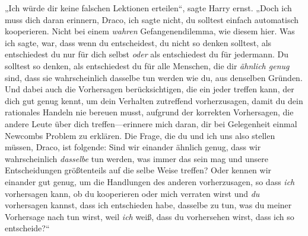 „Ich würde dir keine falschen Lektionen erteilen“, sagte Harry ernst. „Doch ich muss dich daran erinnern, Draco, ich sagte nicht, du solltest einfach automatisch kooperieren. Nicht bei einem \emph{wahren} Gefangenendilemma, wie diesem hier. Was ich sagte, war, dass wenn du entscheidest, du nicht so denken solltest, als entschiedest du nur für dich selbst \emph{oder} als entschiedest du für jedermann. Du solltest so denken, als entschiedest du für alle Menschen, die dir \emph{ähnlich genug} sind, dass sie wahrscheinlich dasselbe tun werden wie du, aus denselben Gründen. Und dabei auch die Vorhersagen berücksichtigen, die ein jeder treffen kann, der dich gut genug kennt, um dein Verhalten zutreffend vorherzusagen, damit du dein rationales Handeln nie bereuen musst, aufgrund der korrekten Vorhersagen, die andere Leute über dich treffen—erinnere mich daran, dir bei Gelegenheit einmal Newcombs Problem zu erklären. Die Frage, die du und ich uns also stellen müssen, Draco, ist folgende: Sind wir einander ähnlich genug, dass wir wahrscheinlich \emph{dasselbe} tun werden, was immer das sein mag und unsere Entscheidungen größtenteils auf die selbe Weise treffen? Oder kennen wir einander gut genug, um die Handlungen des anderen vorherzusagen, so dass \emph{ich} vorhersagen kann, ob du kooperieren oder mich verraten wirst und \emph{du} vorhersagen kannst, dass ich entschieden habe, dasselbe zu tun, was du meiner Vorhersage nach tun wirst, weil \emph{ich} weiß, dass du vorhersehen wirst, dass ich so entscheide?“

